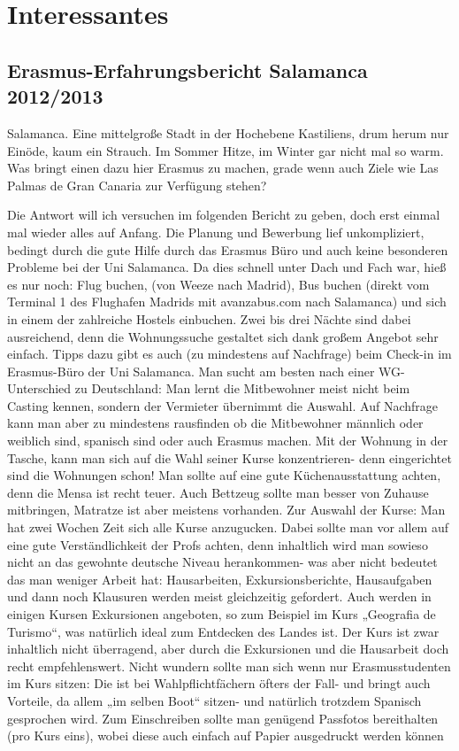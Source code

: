 \chapter{Interessantes} 

\section{Erasmus-Erfahrungsbericht Salamanca 2012/2013}

Salamanca. Eine mittelgroße Stadt in der Hochebene Kastiliens, drum herum nur Einöde, kaum ein Strauch. Im Sommer Hitze, im Winter gar nicht mal so warm. Was bringt einen dazu hier Erasmus zu machen, grade wenn auch Ziele wie Las Palmas de Gran Canaria zur Verfügung stehen? 

Die Antwort will ich versuchen im folgenden Bericht zu geben, doch erst einmal mal wieder alles auf Anfang. Die Planung und Bewerbung lief unkompliziert, bedingt durch die gute Hilfe durch das Erasmus Büro und auch keine besonderen Probleme bei der Uni Salamanca. Da dies schnell unter Dach und Fach war, hieß es nur noch: Flug buchen, (von Weeze nach Madrid), Bus buchen (direkt vom Terminal 1 des Flughafen Madrids mit avanzabus.com nach Salamanca) und sich in einem der zahlreiche Hostels einbuchen. Zwei bis drei Nächte sind dabei ausreichend, denn die Wohnungssuche gestaltet sich dank großem Angebot sehr einfach. Tipps dazu gibt es auch (zu mindestens auf Nachfrage) beim Check-in im Erasmus-Büro der Uni Salamanca. Man sucht am besten nach einer WG- Unterschied zu Deutschland: Man lernt die Mitbewohner meist nicht beim Casting kennen, sondern der Vermieter übernimmt die Auswahl. Auf Nachfrage kann man aber zu mindestens rausfinden ob die Mitbewohner männlich oder weiblich sind, spanisch sind oder auch Erasmus machen. Mit der Wohnung in der Tasche, kann man sich auf die Wahl seiner Kurse konzentrieren- denn eingerichtet sind die Wohnungen schon! Man sollte auf eine gute Küchenausstattung achten, denn die Mensa ist recht teuer. Auch Bettzeug sollte man besser von Zuhause mitbringen, Matratze ist aber meistens vorhanden. 
Zur Auswahl der Kurse: Man hat zwei Wochen Zeit sich alle Kurse anzugucken. Dabei sollte man vor allem auf eine gute Verständlichkeit der Profs achten, denn inhaltlich wird man sowieso nicht an das gewohnte deutsche Niveau herankommen- was aber nicht bedeutet das man weniger Arbeit hat: Hausarbeiten, Exkursionsberichte, Hausaufgaben und dann noch Klausuren werden meist gleichzeitig gefordert. Auch werden in einigen Kursen Exkursionen angeboten, so zum Beispiel im Kurs „Geografia de Turismo“, was natürlich ideal zum Entdecken des Landes ist. Der Kurs ist zwar inhaltlich nicht überragend, aber durch die Exkursionen und die Hausarbeit doch recht empfehlenswert. Nicht wundern sollte man sich wenn nur Erasmusstudenten im Kurs sitzen: Die ist bei Wahlpflichtfächern öfters der Fall- und bringt auch Vorteile, da allem „im selben Boot“ sitzen- und natürlich trotzdem Spanisch gesprochen wird. Zum Einschreiben sollte man genügend Passfotos bereithalten (pro Kurs eins), wobei diese auch einfach auf Papier ausgedruckt werden können 
